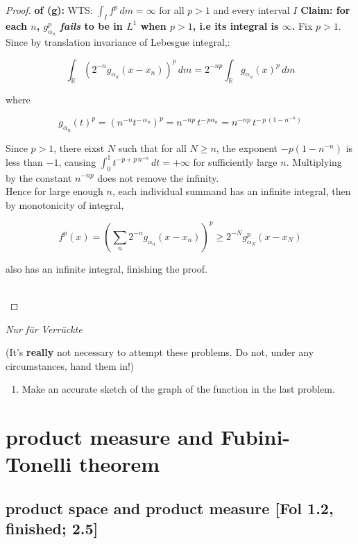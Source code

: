\documentclass{qlnotes-export}
\begin{document}
\begin{proof}

\textbf{of (g):} WTS: \(\int_{I}f^{p}\, dm = \infty\) for all \(p > 1\) and every interval \(I\) \textbf{Claim: for each \(n\), \(g_{\alpha_{n}}^{p}\) \emph{fails} to be in \(L^{1}\) when \(p > 1\), i.e its integral is \(\infty\).} Fix \(p > 1\).\\
Since by translation invariance of Lebesgue integral,:

\[\int_{\mathbb{R}}(2^{- n}g_{\alpha_{n}}(x - x_{n}))^{p}\, dm = 2^{- np}\int_{\mathbb{R}}g_{\alpha_{n}}(x)^{p}\, dm\]

where

\[g_{\alpha_{n}}(t)^{p} = (n^{- n}t^{- \,\alpha_{n}})^{p} = n^{- np}\, t^{- \, p\alpha_{n}} = n^{- np}\, t^{- \, p\,(1 - n^{- n})}\]

Since \(p > 1\), there eixst \(N\) such that for all \(N \geq n\), the exponent \(- p(1 - n^{- n})\) is less than \(- 1\), causing \(\int_{0}^{1}t^{- p + p\, n^{- n}}\, dt = + \infty\) for sufficiently large \(n\). Multiplying by the constant \(n^{- np}\) does not remove the infinity.\\
Hence for large enough \(n\), each individual summand has an infinite integral, then by monotonicity of integral,

\[f^{p}(x) = (\sum\limits_{n}2^{- n}g_{\alpha_{n}}(x - x_{n}))^{p} \geq 2^{- N}g_{\alpha_{N}}^{p}(x - x_{N})\]

also has an infinite integral, finishing the proof.\\
\strut \\

\end{proof}

\emph{Nur für Verrückte}

(It's \textbf{really} not necessary to attempt these problems. Do not, under any circumstances, hand them in!)

\begin{enumerate}
\tightlist
\item
  Make an accurate sketch of the graph of the function in the last problem.
\end{enumerate}

\chapter{product measure and Fubini-Tonelli theorem}\label{product-measure-and-fubini-tonelli-theorem}

\section{product space and product measure {[}Fol 1.2, finished; 2.5{]}}
\end{document}
